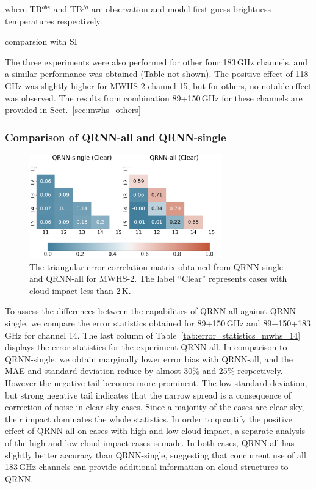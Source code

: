 \documentclass[amt, manuscript]{copernicus}
\newcommand{\todo}[1]{{\color{red} #1}}
\begin{document}
where TB$^{obs}$ and TB$^{fg}$ are observation and model first guess brightness temperatures respectively. 

\todo{comparsion with SI}

The three experiments were also performed for other four 183\,GHz channels, and a similar performance was obtained (Table not shown). The positive effect of 118\,GHz was slightly higher for MWHS-2 channel 15, but for others, no notable effect was observed. The results from combination 89+150\,GHz for these channels are provided in Sect.~\ref{sec:mwhs_others} 

\subsubsection{Comparison of QRNN-all and QRNN-single}
%
\begin{figure}[t]
	\centering
	\includegraphics[height=45mm]{Figures/correlation.pdf} 
	\caption{ The triangular error correlation matrix obtained from QRNN-single and QRNN-all for MWHS-2. The label ``Clear'' represents cases with cloud impact less than 2\,K.}
	\label{fig:correlations_mwhs}	
\end{figure}
To assess the differences between the capabilities of QRNN-all against QRNN-single, we  compare the error statistics obtained for 89+150\,GHz and 89+150+183\,GHz for channel 14. The last column of Table~\ref{tab:error_statistics_mwhs_14} displays the error statistics for the experiment QRNN-all. In comparison to QRNN-single, we obtain marginally lower error bias with QRNN-all, and the MAE and standard deviation reduce by almost 30\% and 25\% respectively. However the negative tail becomes more prominent. The low standard deviation, but strong negative tail indicates that the narrow spread is a consequence of correction of noise in clear-sky cases. Since a majority of the cases are clear-sky, their impact dominates the whole statistics. In order to quantify the positive effect of QRNN-all on cases with high and low cloud impact, a separate analysis of the high and low cloud impact cases is made. In both cases, QRNN-all has slightly better accuracy than QRNN-single, suggesting that concurrent use of all 183\,GHz channels can provide additional information on cloud structures to QRNN. 
\end{document}
